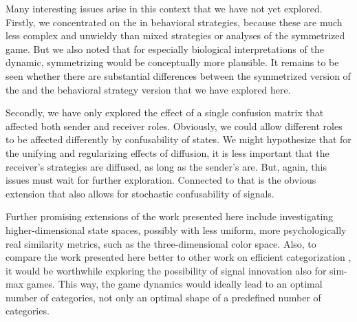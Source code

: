 Many interesting issues arise in this context that we have not yet
explored. Firstly, we concentrated on the \rdd in behavioral
strategies, because these are much less complex and unwieldy than
mixed strategies or analyses of the symmetrized game. But we also
noted that for especially biological interpretations of the dynamic,
symmetrizing would be conceptually more plausible. It remains to be
seen whether there are substantial differences between the symmetrized
version of the \rdd and the behavioral strategy version that
we have explored here.

Secondly, we have only explored the effect of a single confusion
matrix that affected both sender and receiver roles. Obviously, we
could allow different roles to be affected differently by
confusability of states. We might hypothesize that for the unifying
and regularizing effects of diffusion, it is less important that the
receiver's strategies are diffused, as long as the sender's are. But,
again, this issues must wait for further exploration. Connected to
that is the obvious extension that also allows for stochastic
confusability of signals.

Further promising extensions of the work presented here include
investigating higher-dimensional state spaces, possibly with less
uniform, more psychologically real similarity metrics, such as the
three-dimensional color space. Also, to compare the work presented
here better to other work on efficient categorization
\citep[e.g.][]{Mohlin2014:Optimal-Categor}, it would be worthwhile
exploring the possibility of signal innovation
\citep[e.g.][]{McKenzie-AlexanderSkymrs2012:Inventing-New-S} also for
sim-max games. This way, the game dynamics would ideally lead to an
optimal number of categories, not only an optimal shape of a
predefined number of categories.




